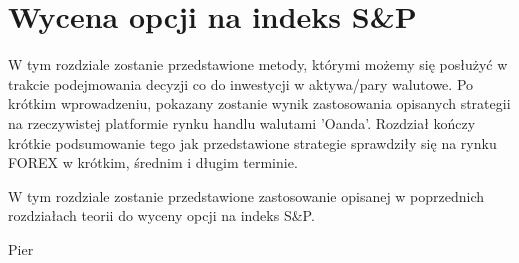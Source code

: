 \documentclass{pracamgr}
\begin{document}



\chapter{Wycena opcji na indeks S\&P}\label{r:sp}
 
W tym rozdziale zostanie przedstawione metody, którymi możemy się posłużyć
w trakcie podejmowania decyzji co do inwestycji w aktywa/pary walutowe.
Po krótkim wprowadzeniu, pokazany zostanie wynik zastosowania opisanych 
strategii na rzeczywistej platformie rynku handlu walutami 'Oanda'.
Rozdział kończy krótkie podsumowanie tego jak przedstawione strategie 
sprawdziły się na rynku FOREX w krótkim, średnim i długim terminie. 


W tym rozdziale zostanie przedstawione zastosowanie opisanej w poprzednich 
rozdziałach teorii do wyceny opcji na indeks S\&P. 

Pier
\end{document}
